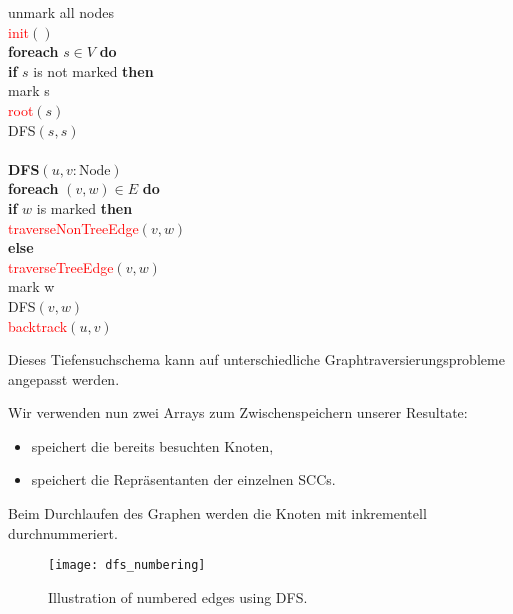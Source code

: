 \begin{pseudocode}
  unmark all nodes \\
  \textcolor{red}{init}\( () \) \\
  \textbf{foreach} \( s \in V \) \textbf{do} \\
  \phantom{\enskip} \textbf{if} \( s \) is not marked \textbf{then} \\
  \phantom{\enskip} \phantom{\enskip} mark s \\
  \phantom{\enskip} \phantom{\enskip} \textcolor{red}{root}\( (s) \) \\
  \phantom{\enskip} \phantom{\enskip} DFS\( (s,s) \) \\
  \enskip{} \\
  \textbf{\textsc{DFS}}\( (u,v : \text{Node}) \) \\
  \phantom{\enskip} \textbf{foreach} \( (v,w) \in E \) \textbf{do} \\
  \phantom{\enskip} \phantom{\enskip} \textbf{if} \( w \) is marked \textbf{then} \\ \phantom{\enskip} \phantom{\enskip} \phantom{\enskip} \textcolor{red}{traverseNonTreeEdge}\( (v,w) \) \\
  \phantom{\enskip} \phantom{\enskip} \textbf{else} \\
  \phantom{\enskip} \phantom{\enskip} \phantom{\enskip} \textcolor{red}{traverseTreeEdge}\( (v,w) \) \\
  \phantom{\enskip} \phantom{\enskip} \phantom{\enskip} mark w \\
  \phantom{\enskip} \phantom{\enskip} \phantom{\enskip} DFS\( (v,w) \) \\
  \phantom{\enskip} \textcolor{red}{backtrack}\( (u,v) \)
\end{pseudocode}

Dieses Tiefensuchschema kann auf unterschiedliche Graphtraversierungsprobleme angepasst werden.

Wir verwenden nun zwei Arrays zum Zwischenspeichern unserer Resultate:
\begin{itemize}
  \item {} speichert die bereits besuchten Knoten,
  \item {} speichert die Repräsentanten der einzelnen SCCs.
\end{itemize}

Beim Durchlaufen des Graphen werden die Knoten mit  inkrementell durchnummeriert.

\begin{figure}[H]
	\texttt{[image: dfs\_numbering]}
	\caption{Illustration of numbered edges using DFS.}
\end{figure}


